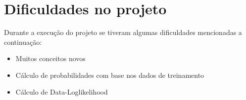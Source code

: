 \section{Dificuldades no projeto}
Durante a execução do projeto se tiveram algumas dificuldades mencionadas a continuação:
\begin{itemize}
	\item Muitos conceitos novos
	\item Cálculo de probabilidades com base nos dados de treinamento
	\item Cálculo de Data-Loglikelihood
\end{itemize}
